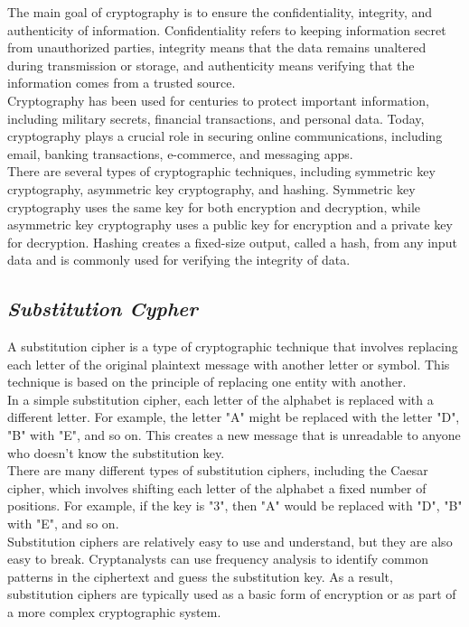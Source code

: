 \documentclass{article}
\begin{document}
The main goal of cryptography is to ensure the confidentiality, integrity, and authenticity of information. Confidentiality refers to keeping information secret from unauthorized parties, integrity means that the data remains unaltered during transmission or storage, and authenticity means verifying that the information comes from a trusted source.\\

Cryptography has been used for centuries to protect important information, including military secrets, financial transactions, and personal data. Today, cryptography plays a crucial role in securing online communications, including email, banking transactions, e-commerce, and messaging apps.\\

There are several types of cryptographic techniques, including symmetric key cryptography, asymmetric key cryptography, and hashing. Symmetric key cryptography uses the same key for both encryption and decryption, while asymmetric key cryptography uses a public key for encryption and a private key for decryption. Hashing creates a fixed-size output, called a hash, from any input data and is commonly used for verifying the integrity of data.
\subsection{\textbf{\textit{Substitution Cypher}}}
A substitution cipher is a type of cryptographic technique that involves replacing each letter of the original plaintext message with another letter or symbol. This technique is based on the principle of replacing one entity with another.\\

In a simple substitution cipher, each letter of the alphabet is replaced with a different letter. For example, the letter "A" might be replaced with the letter "D", "B" with "E", and so on. This creates a new message that is unreadable to anyone who doesn't know the substitution key.\\

There are many different types of substitution ciphers, including the Caesar cipher, which involves shifting each letter of the alphabet a fixed number of positions. For example, if the key is "3", then "A" would be replaced with "D", "B" with "E", and so on.\\

Substitution ciphers are relatively easy to use and understand, but they are also easy to break. Cryptanalysts can use frequency analysis to identify common patterns in the ciphertext and guess the substitution key. As a result, substitution ciphers are typically used as a basic form of encryption or as part of a more complex cryptographic system.
\end{document}
